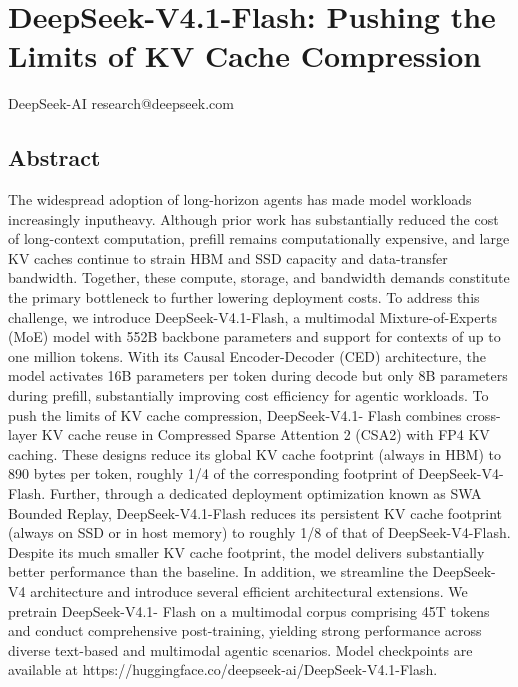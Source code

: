 \documentclass[
  10
]{article}
\author{}
\date{}
\begin{document}
\section{DeepSeek-V4.1-Flash: Pushing the Limits of KV Cache
Compression}\label{deepseek-v4.1-flash-pushing-the-limits-of-kv-cache-compression}

DeepSeek-AI research@deepseek.com

\subsection{Abstract}\label{abstract}

The widespread adoption of long-horizon agents has made model workloads
increasingly inputheavy. Although prior work has substantially reduced
the cost of long-context computation, prefill remains computationally
expensive, and large KV caches continue to strain HBM and SSD capacity
and data-transfer bandwidth. Together, these compute, storage, and
bandwidth demands constitute the primary bottleneck to further lowering
deployment costs. To address this challenge, we introduce
DeepSeek-V4.1-Flash, a multimodal Mixture-of-Experts (MoE) model with
552B backbone parameters and support for contexts of up to one million
tokens. With its Causal Encoder-Decoder (CED) architecture, the model
activates 16B parameters per token during decode but only 8B parameters
during prefill, substantially improving cost efficiency for agentic
workloads. To push the limits of KV cache compression, DeepSeek-V4.1-
Flash combines cross-layer KV cache reuse in Compressed Sparse Attention
2 (CSA2) with FP4 KV caching. These designs reduce its global KV cache
footprint (always in HBM) to 890 bytes per token, roughly 1/4 of the
corresponding footprint of DeepSeek-V4-Flash. Further, through a
dedicated deployment optimization known as SWA Bounded Replay,
DeepSeek-V4.1-Flash reduces its persistent KV cache footprint (always on
SSD or in host memory) to roughly 1/8 of that of DeepSeek-V4-Flash.
Despite its much smaller KV cache footprint, the model delivers
substantially better performance than the baseline. In addition, we
streamline the DeepSeek-V4 architecture and introduce several efficient
architectural extensions. We pretrain DeepSeek-V4.1- Flash on a
multimodal corpus comprising 45T tokens and conduct comprehensive
post-training, yielding strong performance across diverse text-based and
multimodal agentic scenarios. Model checkpoints are available at
https://huggingface.co/deepseek-ai/DeepSeek-V4.1-Flash.
\end{document}

